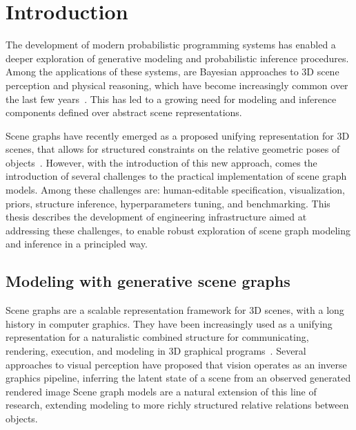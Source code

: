 \chapter{Introduction}
The development of modern probabilistic programming systems has enabled a deeper exploration of generative modeling and probabilistic inference procedures.
Among the applications of these systems, are Bayesian approaches to 3D scene perception and physical reasoning, which have become increasingly common over the last few years~\cite{battaglia2013simulation, izatt2020generative, jampani2015informed, kulkarni2015picture, mansinghka2013approximate, wu2017learning, wu2017neural, romaszko2017vision}.
This has led to a growing need for modeling and inference components defined over abstract scene representations.

Scene graphs have recently emerged as a proposed unifying representation for 3D scenes, that allows for structured constraints on the relative geometric poses of objects~\cite{bzinberg2020scenegraphs, raboh2020differentiable, johnson2018image}.
However, with the introduction of this new approach, comes the introduction of several challenges to the practical implementation of scene graph models.
Among these challenges are: human-editable specification, visualization, priors, structure inference, hyperparameters tuning, and benchmarking.
This thesis describes the development of engineering infrastructure aimed at addressing these challenges, to enable robust exploration of scene graph modeling and inference in a principled way.

\pagebreak

\section{Modeling with generative scene graphs}
Scene graphs are a scalable representation framework for 3D scenes, with a long history in computer graphics.
They have been increasingly used as a unifying representation for a naturalistic combined structure for communicating, rendering, execution, and modeling in 3D graphical programs~\cite{sowizral2000scene}.
Several approaches to visual perception have proposed that vision operates as an inverse graphics pipeline, inferring the latent state of a scene from an observed generated rendered image \cite{romaszko2017vision, DBLP:journals/corr/KulkarniWKT15, moreno2016overcoming}
Scene graph models are a natural extension of this line of research, extending modeling to more richly structured relative relations between objects.

